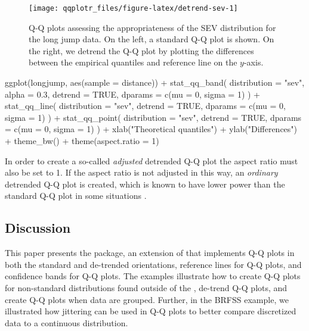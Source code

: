 \begin{Schunk}
\begin{figure}

{\centering \texttt{[image: qqplotr\_files/figure-latex/detrend-sev-1]} 

}

\caption[Q-Q plots assessing the appropriateness of the SEV distribution for the long jump data]{Q-Q plots assessing the appropriateness of the SEV distribution for the long jump data. On the left, a standard Q-Q plot is shown. On the right, we detrend the Q-Q plot by plotting the differences between the empirical quantiles and reference line on the $y$-axis.}\label{fig:detrend-sev}
\end{figure}
\end{Schunk}

\begin{Schunk}
\begin{Sinput}
ggplot(longjump, aes(sample = distance)) +
  stat_qq_band(
  distribution = "sev",
  alpha = 0.3,
  detrend = TRUE,
  dparams = c(mu = 0, sigma = 1)
  ) +
  stat_qq_line(
  distribution = "sev",
  detrend = TRUE,
  dparams = c(mu = 0, sigma = 1)
  ) +
  stat_qq_point(
  distribution = "sev",
  detrend = TRUE,
  dparams = c(mu = 0, sigma = 1)
  ) +
  xlab("Theoretical quantiles") +
  ylab("Differences") +
  theme_bw() +
  theme(aspect.ratio = 1)
\end{Sinput}
\end{Schunk}

In order to create a so-called \emph{adjusted} detrended Q-Q plot
\citep{Loy2016-fg} the aspect ratio must also be set to 1. If the aspect
ratio is not adjusted in this way, an \emph{ordinary} detrended Q-Q plot
is created, which is known to have lower power than the standard Q-Q
plot in some situations \citep{Loy2016-fg}.

\subsection{Discussion}\label{discussion}

This paper presents the  package, an extension of
 that implements Q-Q plots in both the standard and
de-trended orientations, reference lines for Q-Q plots, and confidence
bands for Q-Q plots. The examples illustrate how to create Q-Q plots for
non-standard distributions found outside of the , de-trend
Q-Q plots, and create Q-Q plots when data are grouped. Further, in the
BRFSS example, we illustrated how jittering can be used in Q-Q plots to
better compare discretized data to a continuous distribution.

